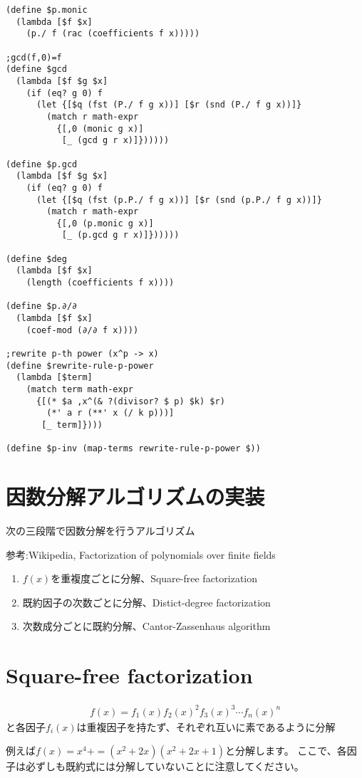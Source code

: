 \documentclass[uplatex]{jsarticle}
\begin{document}
{\begin{verbatim}
(define $p.monic
  (lambda [$f $x]
    (p./ f (rac (coefficients f x)))))

;gcd(f,0)=f
(define $gcd
  (lambda [$f $g $x]
    (if (eq? g 0) f
      (let {[$q (fst (P./ f g x))] [$r (snd (P./ f g x))]}
        (match r math-expr
          {[,0 (monic g x)]
           [_ (gcd g r x)]})))))

(define $p.gcd
  (lambda [$f $g $x]
    (if (eq? g 0) f
      (let {[$q (fst (p.P./ f g x))] [$r (snd (p.P./ f g x))]}
        (match r math-expr
          {[,0 (p.monic g x)]
           [_ (p.gcd g r x)]})))))

(define $deg
  (lambda [$f $x]
    (length (coefficients f x))))

(define $p.∂/∂
  (lambda [$f $x]
    (coef-mod (∂/∂ f x))))

;rewrite p-th power (x^p -> x)
(define $rewrite-rule-p-power
  (lambda [$term]
    (match term math-expr
      {[(* $a ,x^(& ?(divisor? $ p) $k) $r)
        (*' a r (**' x (/ k p)))]
       [_ term]})))

(define $p-inv (map-terms rewrite-rule-p-power $))
\end{verbatim}
}


\section{因数分解アルゴリズムの実装}
次の三段階で因数分解を行うアルゴリズム

参考:Wikipedia, Factorization of polynomials over finite fields

\begin{enumerate}
\item $f(x)$を重複度ごとに分解、Square-free factorization
\item 既約因子の次数ごとに分解、Distict-degree factorization
\item 次数成分ごとに既約分解、Cantor-Zassenhaus algorithm
\end{enumerate}

\section{Square-free factorization}

\begin{align*}
f(x)=f_1(x)f_2(x)^2f_3(x)^3\cdots f_n(x)^n
\end{align*}
と各因子$f_i(x)$は重複因子を持たず、それぞれ互いに素であるように分解

例えば$f(x)=x^4+=(x^2+2x)(x^2+2x+1)$と分解します。
ここで、各因子は必ずしも既約式には分解していないことに注意してください。
\end{document}
